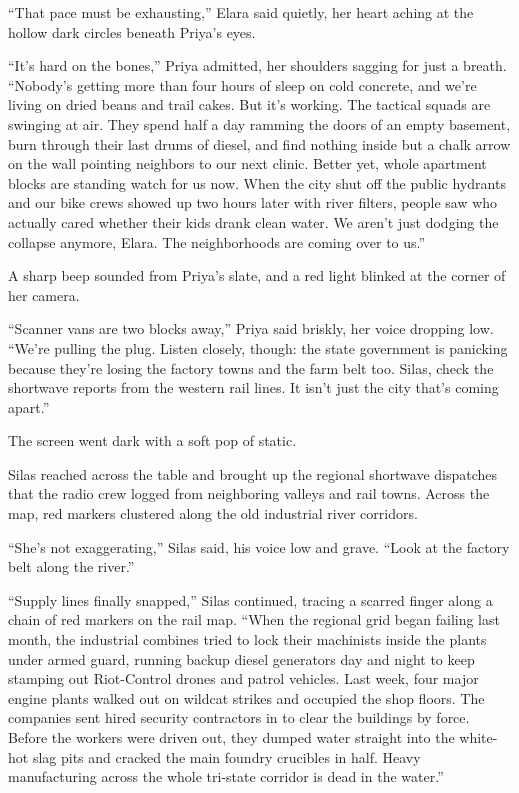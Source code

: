 ``That pace must be exhausting,'' Elara said quietly, her heart aching at the hollow dark circles beneath Priya's eyes.

``It’s hard on the bones,'' Priya admitted, her shoulders sagging for just a breath. ``Nobody's getting more than four hours of sleep on cold concrete, and we're living on dried beans and trail cakes. But it's working. The tactical squads are swinging at air. They spend half a day ramming the doors of an empty basement, burn through their last drums of diesel, and find nothing inside but a chalk arrow on the wall pointing neighbors to our next clinic. Better yet, whole apartment blocks are standing watch for us now. When the city shut off the public hydrants and our bike crews showed up two hours later with river filters, people saw who actually cared whether their kids drank clean water. We aren't just dodging the collapse anymore, Elara. The neighborhoods are coming over to us.''

A sharp beep sounded from Priya’s slate, and a red light blinked at the corner of her camera.

``Scanner vans are two blocks away,'' Priya said briskly, her voice dropping low. ``We’re pulling the plug. Listen closely, though: the state government is panicking because they're losing the factory towns and the farm belt too. Silas, check the shortwave reports from the western rail lines. It isn't just the city that's coming apart.''

The screen went dark with a soft pop of static.

Silas reached across the table and brought up the regional shortwave dispatches that the radio crew logged from neighboring valleys and rail towns. Across the map, red markers clustered along the old industrial river corridors.

``She’s not exaggerating,'' Silas said, his voice low and grave. ``Look at the factory belt along the river.''

``Supply lines finally snapped,'' Silas continued, tracing a scarred finger along a chain of red markers on the rail map. ``When the regional grid began failing last month, the industrial combines tried to lock their machinists inside the plants under armed guard, running backup diesel generators day and night to keep stamping out Riot-Control drones and patrol vehicles. Last week, four major engine plants walked out on wildcat strikes and occupied the shop floors. The companies sent hired security contractors in to clear the buildings by force. Before the workers were driven out, they dumped water straight into the white-hot slag pits and cracked the main foundry crucibles in half. Heavy manufacturing across the whole tri-state corridor is dead in the water.''

